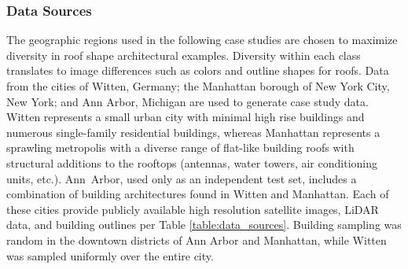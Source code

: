 \subsubsection{Data Sources}
The geographic regions used in the following case studies are chosen to maximize diversity in roof shape architectural examples. Diversity within each class translates to image differences such as colors and outline shapes for roofs.  Data from the cities of Witten, Germany; the Manhattan borough of New York City, New York; and Ann Arbor, Michigan are used to generate case study data. Witten represents a small urban city with minimal high rise buildings and numerous single-family residential buildings, whereas Manhattan represents a sprawling metropolis with a diverse range of flat-like building roofs with structural additions to the rooftops (antennas, water towers, air conditioning units, etc.). Ann~Arbor, used only as an independent test set, includes a combination of building architectures found in Witten and Manhattan.  Each of these cities provide publicly available high resolution satellite images, LiDAR data, and building outlines per Table \ref{table:data_sources}. Building sampling was random in the downtown districts of Ann Arbor and Manhattan, while Witten was sampled uniformly over the entire city.


\begin{table}[H]
\centering
\caption{Satellite, LiDAR, and building data sources.}\label{table:data_sources}
\end{table}

